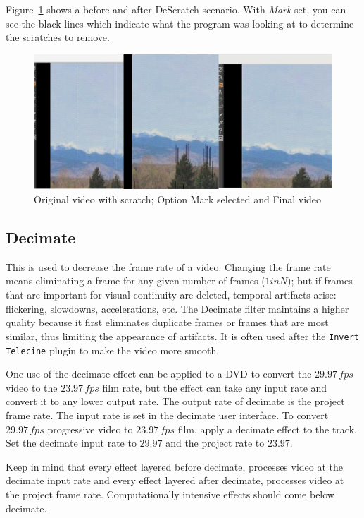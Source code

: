 Figure~\ref{fig:descratch} shows a before and after DeScratch scenario. With \textit{Mark} set, you can see the black lines which indicate what the program was looking at to determine the scratches to remove.

\begin{figure}[htpb]
    \centering
    \includegraphics[width=0.9\linewidth]{images/descratch.png}
    \caption{Original video with scratch; Option Mark selected and Final video}
    \label{fig:descratch}
\end{figure}

\subsection{Decimate}%
\label{sub:decimate}

This is used to decrease the frame rate of a video. Changing the frame rate means eliminating a frame for any given number of frames ($1 in N$); but if frames that are important for visual continuity are deleted, temporal artifacts arise: flickering, slowdowns, accelerations, etc. The Decimate filter maintains a higher quality because it first eliminates duplicate frames or frames that are most similar, thus limiting the appearance of artifacts. It is often used after the \texttt{Invert Telecine} plugin to make the video more smooth.

One use of the decimate effect can be applied to a DVD to convert the $29.97\,fps$ video to the $23.97\,fps$ film rate, but the effect can take any input rate and convert it to any lower output rate. The output rate of decimate is the project frame rate. The input rate is set in the decimate user interface. To convert $29.97\,fps$ progressive video to $23.97\,fps$ film, apply a decimate effect to the track. Set the decimate input rate to $29.97$ and the project rate to $23.97$.

Keep in mind that every effect layered before decimate, processes video at the decimate input rate and every effect layered after decimate, processes video at the project frame rate. Computationally intensive effects should come below decimate.

